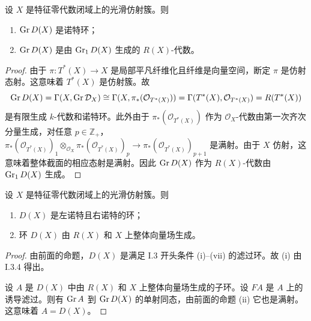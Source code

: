 \begin{proposition}
设 $X$ 是特征零代数闭域上的光滑仿射簇。则
\begin{enumerate}[label=(\roman*)]
  \item $\operatorname{Gr} D(X)$ 是诺特环；
  \item $\operatorname{Gr} D(X)$ 是由 $\operatorname{Gr}_1D(X)$ 生成的 $R(X)$-代数。
\end{enumerate}
\end{proposition}

\begin{proof}
由于 $\pi:T^*(X)\to X$ 是局部平凡纤维化且纤维是向量空间，断定 $\pi$ 是仿射态射。这意味着 $T^*(X)$ 是仿射簇。故
$$\operatorname{Gr} D(X)=\Gamma(X,\operatorname{Gr}\mathcal{D}_X)\cong\Gamma(X,\pi_*(\mathcal{O}_{T^*(X)}))=\Gamma(T^*(X),\mathcal{O}_{T^*(X)})=R(T^*(X))$$
是有限生成 $k$-代数和诺特环。此外由于 $\pi_*(\mathcal{O}_{T^*(X)})$ 作为 $\mathcal{O}_X$-代数由第一次齐次分量生成，对任意 $p\in\mathbb{Z}_+$，$\pi_*(\mathcal{O}_{T^*(X)})_1\otimes_{\mathcal{O}_X}\pi_*(\mathcal{O}_{T^*(X)})_p\to\pi_*(\mathcal{O}_{T^*(X)})_{p+1}$ 是满射。由于 $X$ 仿射，这意味着整体截面的相应态射是满射。因此 $\operatorname{Gr} D(X)$ 作为 $R(X)$-代数由 $\operatorname{Gr}_1D(X)$ 生成。
\end{proof}

\begin{theorem}
设 $X$ 是特征零代数闭域上的光滑仿射簇。则
\begin{enumerate}[label=(\roman*)]
  \item $D(X)$ 是左诺特且右诺特的环；
  \item 环 $D(X)$ 由 $R(X)$ 和 $X$ 上整体向量场生成。
\end{enumerate}
\end{theorem}

\begin{proof}
由前面的命题，$D(X)$ 是满足 I.3 开头条件 (i)--(vii) 的滤过环。故 (i) 由 I.3.4 得出。

设 $A$ 是 $D(X)$ 中由 $R(X)$ 和 $X$ 上整体向量场生成的子环。设 $F A$ 是 $A$ 上的诱导滤过。则有 $\operatorname{Gr} A$ 到 $\operatorname{Gr} D(X)$ 的单射同态，由前面的命题 (ii) 它也是满射。这意味着 $A=D(X)$。
\end{proof}
